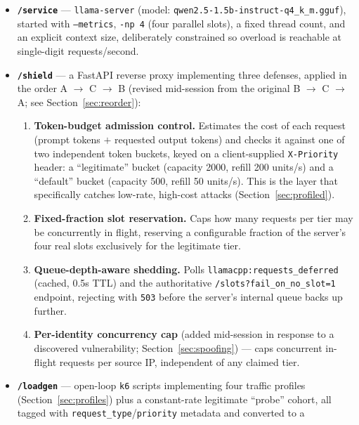 \documentclass[11pt]{article}
\begin{document}
\begin{itemize}
    \item \textbf{\texttt{/service}} --- \texttt{llama-server} (model:
    \texttt{qwen2.5-1.5b-instruct-q4\_k\_m.gguf}), started with
    \texttt{--metrics}, \texttt{-np 4} (four parallel slots), a fixed thread
    count, and an explicit context size, deliberately constrained so overload
    is reachable at single-digit requests/second.
    \item \textbf{\texttt{/shield}} --- a FastAPI reverse proxy implementing
    three defenses, applied in the order A $\to$ C $\to$ B (revised mid-session
    from the original B $\to$ C $\to$ A; see Section~\ref{sec:reorder}):
    \begin{enumerate}[label=(\Alph*)]
        \item \textbf{Token-budget admission control.} Estimates the cost of
        each request (prompt tokens $+$ requested output tokens) and checks it
        against one of two independent token buckets, keyed on a
        client-supplied \texttt{X-Priority} header: a ``legitimate'' bucket
        (capacity 2000, refill 200 units/s) and a ``default'' bucket (capacity
        500, refill 50 units/s). This is the layer that specifically catches
        low-rate, high-cost attacks (Section~\ref{sec:profiled}).
        \item \textbf{Fixed-fraction slot reservation.} Caps how many requests
        per tier may be concurrently in flight, reserving a configurable
        fraction of the server's four real slots exclusively for the
        legitimate tier.
        \item \textbf{Queue-depth-aware shedding.} Polls
        \texttt{llamacpp:requests\_deferred} (cached, 0.5s TTL) and the
        authoritative \texttt{/slots?fail\_on\_no\_slot=1} endpoint, rejecting
        with \texttt{503} before the server's internal queue backs up further.
        \item \textbf{Per-identity concurrency cap} (added mid-session in
        response to a discovered vulnerability; Section~\ref{sec:spoofing}) ---
        caps concurrent in-flight requests per source IP, independent of any
        claimed tier.
    \end{enumerate}
    \item \textbf{\texttt{/loadgen}} --- open-loop \texttt{k6} scripts
    implementing four traffic profiles (Section~\ref{sec:profiles}) plus a
    constant-rate legitimate ``probe'' cohort, all tagged with
    \texttt{request\_type}/\texttt{priority} metadata and converted to a

\end{itemize}
\end{document}

